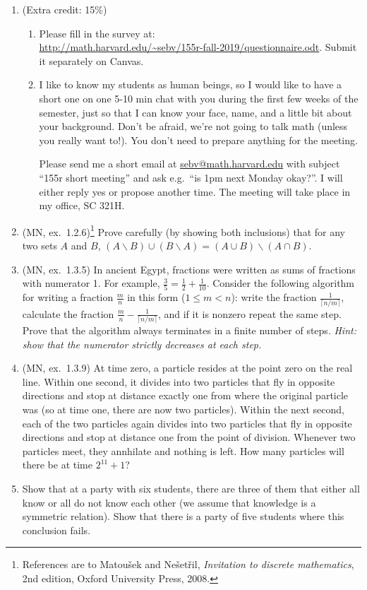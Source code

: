 \documentclass{amsart}
\theoremstyle{definition}
\begin{document}
\begin{enumerate}
\item (Extra credit: 15\%) \begin{enumerate}
\item Please fill in the survey at: \\
  \url{http://math.harvard.edu/~sebv/155r-fall-2019/questionnaire.odt}. Submit it separately on Canvas.
\item I like to know my students as human beings, so I would like to have a short one on one 5-10 min chat with you during the first few weeks of the semester, just so that I can know your face, name, and a little bit about your background. Don't be afraid, we're not going to talk math (unless you really want to!). You don't need to prepare anything for the meeting.

  Please send me a short email at \url{sebv@math.harvard.edu} with subject ``155r short meeting'' and ask e.g.\ ``is 1pm next Monday okay?''. I will either reply yes or propose another time. The meeting will take place in my office, SC 321H.
\end{enumerate}
\item (MN, ex.\ 1.2.6)\footnote{References are to Matoušek and Nešetřil, \emph{Invitation to discrete mathematics}, 2nd edition, Oxford University Press, 2008.} Prove carefully (by showing both inclusions) that for any two sets $A$ and $B$, $(A \backslash B) \cup (B \backslash A) = (A \cup B) \backslash (A \cap B)$.
\item   (MN, ex.\ 1.3.5) In ancient Egypt, fractions were written as sums of fractions with numerator 1. For example, $\frac{3}{5} = \frac{1}{2} + \frac{1}{10}$. Consider the following algorithm for writing a fraction $\frac{m}{n}$ in this form ($1 \le m < n$): write the fraction $\frac{1}{\lceil n / m \rceil}$, calculate the fraction $\frac{m}{n} - \frac{1}{\lceil n / m \rceil}$, and if it is nonzero repeat the same step. Prove that the algorithm always terminates in a finite number of steps. \emph{Hint: show that the numerator strictly decreases at each step.}
\item (MN, ex.\ 1.3.9) At time zero, a particle resides at the point zero on the real line. Within one second, it divides into two particles that fly in opposite directions and stop at distance exactly one from where the original particle was (so at time one, there are now two particles). Within the next second, each of the two particles again divides into two particles that fly in opposite directions and stop at distance one from the point of division. Whenever two particles meet, they annhilate and nothing is left. How many particles will there be at time $2^{11} + 1$?
\item Show that at a party with six students, there are three of them that either all know or all do not know each other (we assume that knowledge is a symmetric relation). Show that there is a party of five students where this conclusion fails.
\end{enumerate}
\end{document}
